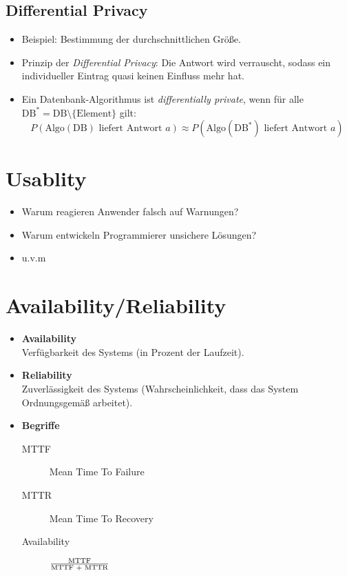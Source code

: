         \subsection{Differential Privacy}
            \begin{itemize}
            	\item Beispiel: Bestimmung der durchschnittlichen Größe.
            	\item Prinzip der \textit{Differential Privacy}: Die Antwort wird verrauscht, sodass ein individueller Eintrag quasi keinen Einfluss mehr hat.
            	\item Ein Datenbank-Algorithmus ist \textit{differentially private}, wenn für alle \( \textrm{DB}^* = \textrm{DB} \setminus \{ \textrm{Element} \} \) gilt:
                	\begin{equation*}
	                	P(\textrm{Algo}(\textrm{DB}) \textrm{ liefert Antwort } a) \approx P(\textrm{Algo}(\textrm{DB}^*) \textrm{ liefert Antwort } a)
                	\end{equation*}
            \end{itemize}

    \section{Usablity}
        \begin{itemize}
        	\item Warum reagieren Anwender falsch auf Warnungen?
        	\item Warum entwickeln Programmierer unsichere Lösungen?
        	\item u.v.m
        \end{itemize}

    \section{Availability/Reliability}
        \begin{itemize}
        	\item \textbf{Availability} \\ Verfügbarkeit des Systems (in Prozent der Laufzeit).
        	\item \textbf{Reliability} \\ Zuverlässigkeit des Systems (Wahrscheinlichkeit, dass das System Ordnungsgemäß arbeitet).
        	\item \textbf{Begriffe}
            	\begin{description}
            		\item[MTTF] Mean Time To Failure
            		\item[MTTR] Mean Time To Recovery
            		\item[Availability] \( \frac{\textrm{MTTF}}{\textrm{MTTF\ + \textrm{MTTR}}} \)
            	\end{description}
        \end{itemize}
    
